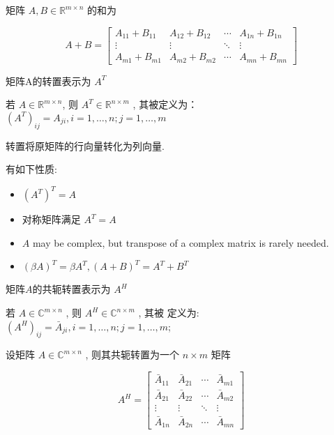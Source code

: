 \begin{definition}[矩阵加法]
    矩阵 $ A, B \in \mathbb{R}^{m \times n} $ 的和为

    $$ A+B=\left[\begin{array}{cccc}A_{11}+B_{11} & A_{12}+B_{12} & \cdots & A_{1 n}+B_{1 n} \\ \vdots & \vdots & \ddots & \vdots \\ A_{m 1}+B_{m 1} & A_{m 2}+B_{m 2} & \cdots & A_{m n}+B_{m n}\end{array}\right] $$
\end{definition}

\begin{definition}[Transpose]
    矩阵A的转置表示为 $ A^{T} $
    
    若 $A\in \mathbb{R}^{m \times n} $, 则 $ A^{T} \in \mathbb{R}^{n \times m} $ , 其被定义为： $ \left(A^{T}\right)_{i j}=A_{j i}, i=1, \ldots, n ; j=1, \ldots, m $
\end{definition}

转置将原矩阵的行向量转化为列向量.

\begin{corollary}
    [转置的性质]
    有如下性质:
    \begin{itemize}
        \item $ \left(A^{T}\right)^{T}=A $
        \item 对称矩阵满足 $ A^{T}=A $
        \item  $A$ may be complex, but transpose of a complex matrix is rarely needed.
        \item $ (\beta A)^{T}=\beta A^{T},(A+B)^{T}=A^{T}+B^{T} $
    \end{itemize}
\end{corollary}

\begin{definition}[共轭转置]
    矩阵$A$的共轭转置表示为 $ A^{{H}} $
    
    若 $ {A} \in \mathbb{C}^{m \times n} $ , 则 $ A^{H} \in \mathbb{C}^{n \times m} $ , 其被 定义为: $ \left(A^{H}\right)_{i j}=\bar{A}_{j i}, i=1, \ldots, n ; j=1, \ldots, m $;

    设矩阵 $ A \in \mathbb{C}^{m \times n} $ , 则其共轭转置为一个 $ n \times m $ 矩阵

$$
A^{H}=\left[\begin{array}{cccc}
\bar{A}_{11} & \bar{A}_{21} & \cdots & \bar{A}_{m 1} \\
\bar{A}_{21} & \bar{A}_{22} & \cdots & \bar{A}_{m 2} \\
\vdots & \vdots & \ddots & \vdots \\
\bar{A}_{1 n} & \bar{A}_{2 n} & \cdots & \bar{A}_{m n}
\end{array}\right]
$$
\end{definition}

